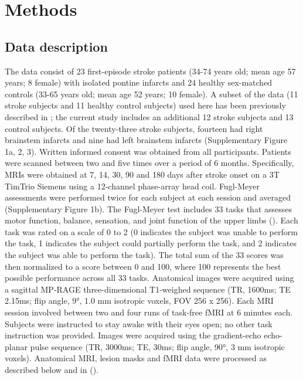 \documentclass[phd,tocprelim]{cornell}
\begin{document}
\section{Methods}
	\subsection*{Data description}
	 The data consist of 23 first-episode stroke patients (34-74 years old; mean age 57 years; 8 female) with isolated pontine infarcts and 24 healthy sex-matched controls (33-65 years old; mean age 52 years; 10 female). A subset of the data (11 stroke subjects and 11 healthy control subjects) used here has been previously described in \cite{Lu2011-ow}; the current study includes an additional 12 stroke subjects and 13 control subjects. Of the twenty-three stroke subjects, fourteen had right brainstem infarcts and nine had left brainstem infarcts (Supplementary Figure 1a, 2, 3). Written informed consent was obtained from all participants. Patients were scanned between two and five times over a period of 6 months. Specifically, MRIs were obtained at 7, 14, 30, 90 and 180 days after stroke onset on a 3T TimTrio Siemens using a 12-channel phase-array head coil. Fugl-Meyer assessments were performed twice for each subject at each session and averaged (Supplementary Figure 1b). The Fugl-Meyer test includes 33 tasks that assesses motor function, balance, sensation, and joint function of the upper limbs (\cite{Fugl-Meyer1975-nh}). Each task was rated on a scale of 0 to 2 (0 indicates the subject was unable to perform the task, 1 indicates the subject could partially perform the task, and 2 indicates the subject was able to perform the task). The total sum of the 33 scores was then normalized to a score between 0 and 100, where 100 represents the best possible performance across all 33 tasks. Anatomical images were acquired using a sagittal MP-RAGE three-dimensional T1-weighed sequence (TR, 1600ms; TE 2.15ms; flip angle, 9°, 1.0 mm isotropic voxels, FOV 256 x 256). Each MRI session involved between two and four runs of task-free fMRI at 6 minutes each. Subjects were instructed to stay awake with their eyes open; no other task instruction was provided. Images were acquired using the gradient-echo echo-planar pulse sequence (TR, 3000ms; TE, 30ms; flip angle, 90°, 3 mm isotropic voxels). Anatomical MRI, lesion masks and fMRI data were processed as described below and in (\cite{Olafson2021-qt}).
	 
 
    	 
\end{document}
